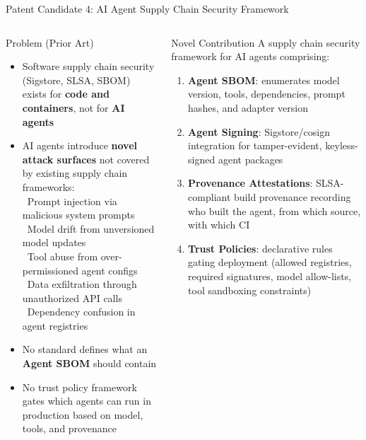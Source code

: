 \begin{frame}{\fontsize{9}{11}\selectfont Patent Candidate 4: AI Agent Supply Chain Security Framework}
  \vspace{-0.3cm}

  \fontsize{5.5}{6.5}\selectfont
  \begin{columns}[T]
    \begin{alertblock}{\fontsize{5.5}{6.5}\selectfont Problem (Prior Art)}
      \fontsize{5.5}{6.5}\selectfont
      \begin{itemize}
        \setlength{\itemsep}{0pt}
        \item Software supply chain security (Sigstore, SLSA, SBOM) exists for
              \textbf{code and containers}, not for \textbf{AI agents}
        \item AI agents introduce \textbf{novel attack surfaces} not covered by existing supply chain frameworks:\\
          {\fontsize{5}{6}\selectfont
          \textbullet\ Prompt injection via malicious system prompts\\
          \textbullet\ Model drift from unversioned model updates\\
          \textbullet\ Tool abuse from over-permissioned agent configs\\
          \textbullet\ Data exfiltration through unauthorized API calls\\
          \textbullet\ Dependency confusion in agent registries}
        \item No standard defines what an \textbf{Agent SBOM} should contain
        \item No trust policy framework gates which agents can run in production
              based on model, tools, and provenance
      \end{itemize}
    \end{alertblock}
    \vspace{-0.15cm}
    \begin{block}{\fontsize{5.5}{6.5}\selectfont Novel Contribution}
      \fontsize{5.5}{6.5}\selectfont
      A supply chain security framework for AI agents comprising:
      \begin{enumerate}
        \setlength{\itemsep}{0pt}
        \item \textbf{Agent SBOM}: enumerates model version, tools, dependencies,
              prompt hashes, and adapter version
        \item \textbf{Agent Signing}: Sigstore/cosign integration for
              tamper-evident, keyless-signed agent packages
        \item \textbf{Provenance Attestations}: SLSA-compliant build provenance
              recording who built the agent, from which source, with which CI
        \item \textbf{Trust Policies}: declarative rules gating deployment
              (allowed registries, required signatures, model allow-lists,
              tool sandboxing constraints)
      \end{enumerate}
    \end{block}


\end{columns}
\end{frame}
